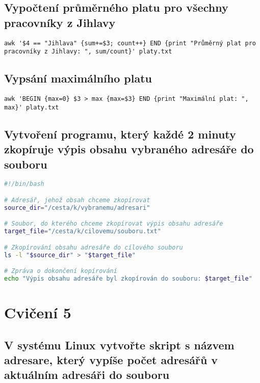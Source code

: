 \documentclass{article}
\begin{document}
\subsection{Vypočtení průměrného platu pro všechny pracovníky z Jihlavy}

\begin{lstlisting}
awk '$4 == "Jihlava" {sum+=$3; count++} END {print "Průměrný plat pro pracovníky z Jihlavy: ", sum/count}' platy.txt
\end{lstlisting}

\subsection{Vypsání maximálního platu}

\begin{lstlisting}
awk 'BEGIN {max=0} $3 > max {max=$3} END {print "Maximální plat: ", max}' platy.txt
\end{lstlisting}

\subsection{Vytvoření programu, který každé 2 minuty zkopíruje výpis obsahu vybraného adresáře do souboru}

\begin{lstlisting}[language=Bash]
#!/bin/bash

# Adresář, jehož obsah chceme zkopírovat
source_dir="/cesta/k/vybranemu/adresari"

# Soubor, do kterého chceme zkopírovat výpis obsahu adresáře
target_file="/cesta/k/cilovemu/souboru.txt"

# Zkopírování obsahu adresáře do cílového souboru
ls -l "$source_dir" > "$target_file"

# Zpráva o dokončení kopírování
echo "Výpis obsahu adresáře byl zkopírován do souboru: $target_file"
\end{lstlisting}
\section{Cvičení 5}
\subsection{V systému Linux vytvořte skript s názvem adresare, který vypíše počet adresářů v aktuálním adresáři do souboru}

\end{document}
